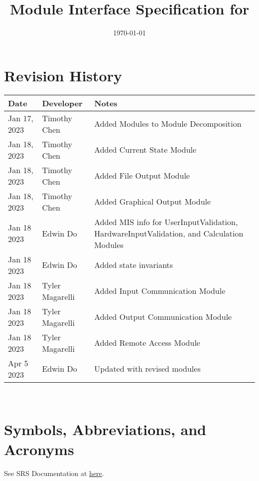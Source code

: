 \documentclass[12pt, titlepage]{article}
\begin{document}
\title{Module Interface Specification for \progname{}}

\author{\authname}

\date{\today}

\maketitle


\section{Revision History}

\begin{tabularx}{\textwidth}{p{3cm}p{2cm}X}
\toprule {\bf Date} & {\bf Developer} & {\bf Notes}\\
\midrule
Jan 17, 2023 & Timothy Chen & Added Modules to Module Decomposition\\
Jan 18, 2023 & Timothy Chen & Added Current State Module \\
Jan 18, 2023 & Timothy Chen & Added File Output Module \\
Jan 18, 2023 & Timothy Chen & Added Graphical Output Module \\
Jan 18 2023 & Edwin Do & Added MIS info for UserInputValidation, HardwareInputValidation, and Calculation Modules\\
Jan 18 2023 & Edwin Do & Added state invariants\\
Jan 18 2023 & Tyler Magarelli & Added Input Communication Module\\
Jan 18 2023 & Tyler Magarelli & Added Output Communication Module\\
Jan 18 2023 & Tyler Magarelli & Added Remote Access Module\\
Apr 5 2023 & Edwin Do & Updated with revised modules\\
\bottomrule
\end{tabularx}

~\newpage

\section{Symbols, Abbreviations, and Acronyms}

See SRS Documentation at \href{https://github.com/edwin-do/capstoneTeam30/blob/main/docs/SRS/SRS.pdf}{here}.

\end{document}
